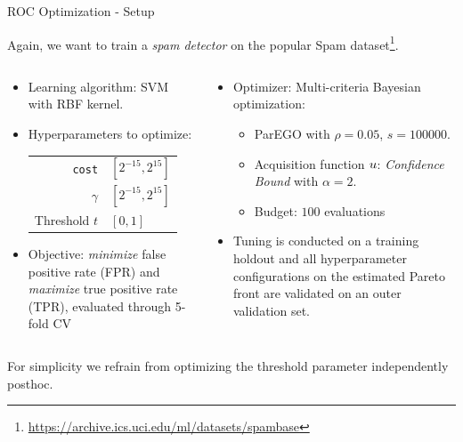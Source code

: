 \begin{frame}{ROC Optimization - Setup}

  Again, we want to train a \textit{spam detector} on the popular Spam dataset\footnote{\url{https://archive.ics.uci.edu/ml/datasets/spambase}}.

\begin{columns}
\begin{column}{0.5\textwidth}
\begin{itemize}
        \item Learning algorithm: SVM with RBF kernel.
        \item Hyperparameters to optimize: \\
        \begin{tabular}{rl}
        \texttt{cost} & $[2^{-15}, 2^{15}]$ \\
        $\gamma$ & $[2^{-15}, 2^{15}]$ \\
        Threshold $t$ & $[0,1]$ \\
        \end{tabular}
        \item Objective: \emph{minimize} false positive rate (FPR) and \emph{maximize} true positive rate (TPR), evaluated through 5-fold CV
\end{itemize}
\end{column}%
\begin{column}{0.5\textwidth}
\begin{itemize}
        \item Optimizer: Multi-criteria Bayesian optimization:
            \begin{itemize}
              \item ParEGO with $\rho = 0.05$, $s = 100000$.
              \item Acquisition function $u$: \emph{Confidence Bound} with $\alpha = 2$.
              \item Budget: $100$ evaluations
            \end{itemize}
        \item Tuning is conducted on a training holdout and all hyperparameter configurations on the estimated Pareto front are validated on an outer validation set.
\end{itemize}
\end{column}
\end{columns}
\vspace{0.5cm}
{\footnotesize For simplicity we refrain from optimizing the threshold parameter independently posthoc.}
\end{frame}

